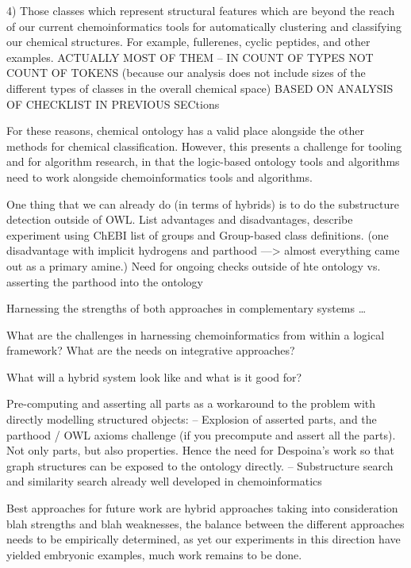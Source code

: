 \documentclass[10pt]{bmc_article}
\newenvironment{bmcformat}{\baselineskip20pt\sloppy\setboolean{publ}{false}}{\baselineskip20pt\sloppy}
\begin{document}
\begin{bmcformat}
4) Those classes which represent structural features which are beyond the reach of our current chemoinformatics tools for automatically clustering and classifying our chemical structures. For example, fullerenes, cyclic peptides, and other examples. 
ACTUALLY MOST OF THEM -- IN COUNT OF TYPES NOT COUNT OF TOKENS (because our analysis does not include sizes of the different types of classes in the overall chemical space)
BASED ON ANALYSIS OF CHECKLIST IN PREVIOUS SECtions



For these reasons, chemical ontology has a valid place alongside the other methods for chemical classification.  However, this presents a challenge for tooling and for algorithm research, in that the logic-based ontology tools and algorithms need to work alongside chemoinformatics tools and algorithms. 

One thing that we can already do (in terms of hybrids) is to do the substructure detection outside of OWL.  List advantages and disadvantages, describe experiment using ChEBI list of groups and Group-based class definitions.  (one disadvantage with implicit hydrogens and parthood ---> almost everything came out as a primary amine.)  Need for ongoing checks outside of hte ontology vs. asserting the parthood into the ontology


Harnessing the strengths of both approaches in complementary systems \ldots

What are the challenges in harnessing chemoinformatics from within a logical framework?  What are the needs on integrative approaches?

What will a hybrid system look like and what is it good for? 


Pre-computing and asserting all parts as a workaround to the problem with directly modelling structured objects: 
-- Explosion of asserted parts, and the parthood / OWL axioms challenge (if you precompute and assert all the parts). Not only parts, but also properties. Hence the need for Despoina's work so that graph structures can be exposed to the ontology directly. 
-- Substructure search and similarity search already well developed in chemoinformatics 


Best approaches for future work are hybrid approaches taking into consideration blah strengths and blah weaknesses, the balance between the different approaches needs to be empirically determined, as yet our experiments in this direction have yielded embryonic examples, much work remains to be done. 





\end{bmcformat}
\end{document}
